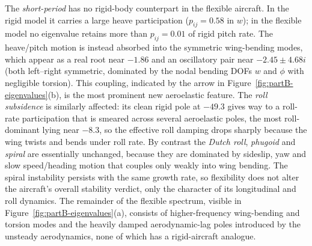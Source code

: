 The \emph{short-period} has no rigid-body counterpart in the flexible aircraft. In the rigid model it carries a large heave participation ($p_{ij}=0.58$ in $w$); in the flexible model no eigenvalue retains more than $p_{ij}=0.01$ of rigid pitch rate. The heave/pitch motion is instead absorbed into the symmetric wing-bending modes, which appear as a real root near $-1.86$ and an oscillatory pair near $-2.45\pm4.68i$ (both left--right symmetric, dominated by the nodal bending DOFs $w$ and $\phi$ with negligible torsion). This coupling, indicated by the arrow in Figure~\ref{fig:partB-eigenvalues}(b), is the most prominent new aeroelastic feature. The \emph{roll subsidence} is similarly affected: its clean rigid pole at $-49.3$ gives way to a roll-rate participation that is smeared across several aeroelastic poles, the most roll-dominant lying near $-8.3$, so the effective roll damping drops sharply because the wing twists and bends under roll rate. By contrast the \emph{Dutch roll}, \emph{phugoid} and \emph{spiral} are essentially unchanged, because they are dominated by sideslip, yaw and slow speed/heading motion that couples only weakly into wing bending. The spiral instability persists with the same growth rate, so flexibility does not alter the aircraft's overall stability verdict, only the character of its longitudinal and roll dynamics. The remainder of the flexible spectrum, visible in Figure~\ref{fig:partB-eigenvalues}(a), consists of higher-frequency wing-bending and torsion modes and the heavily damped aerodynamic-lag poles introduced by the unsteady aerodynamics, none of which has a rigid-aircraft analogue.
